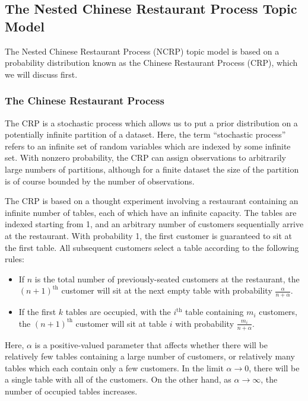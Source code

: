 \documentclass{article}
\newcommand{\nth}{^{\text{th}}}
\begin{document}
\subsection{The Nested Chinese Restaurant Process Topic Model}

The Nested Chinese Restaurant Process (NCRP) topic model is based on a probability distribution known as the Chinese Restaurant Process (CRP), which we will discuss first.

\subsubsection{The Chinese Restaurant Process}

The CRP is a stochastic process which allows us to put a prior distribution on a potentially infinite partition of a dataset.
Here, the term ``stochastic process'' refers to an infinite set of random variables which are indexed by some infinite set.
With nonzero probability, the CRP can assign observations to arbitrarily large numbers of partitions, although for a finite dataset the size of the partition is of course bounded by the number of observations.

The CRP is based on a thought experiment involving a restaurant containing an infinite number of tables, each of which have an infinite capacity.
The tables are indexed starting from 1, and an arbitrary number of customers sequentially arrive at the restaurant.
With probability 1, the first customer is guaranteed to sit at the first table.
All subsequent customers select a table according to the following rules:
\begin{itemize}
\item If $n$ is the total number of previously-seated customers at the restaurant, the $(n+1)\nth$ customer will sit at the next empty table with probability $\frac{\alpha}{n + \alpha}$.
\item If the first $k$ tables are occupied, with the $i\nth$ table containing $m_i$ customers, the $(n+1)\nth$ customer will sit at table $i$ with probability $\frac{m_i}{n+\alpha}$.
\end{itemize}
Here, $\alpha$ is a positive-valued parameter that affects whether there will be relatively few tables containing a large number of customers, or relatively many tables which each contain only a few customers.
In the limit $\alpha \to 0$, there will be a single table with all of the customers.
On the other hand, as $\alpha \to \infty$, the number of occupied tables increases.
\end{document}

